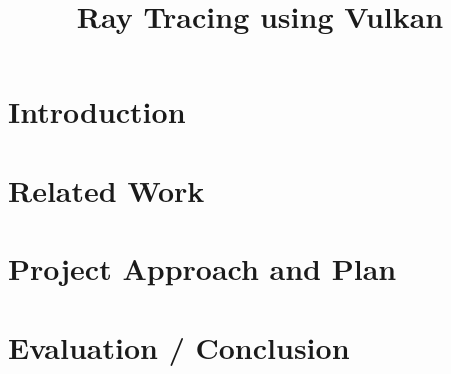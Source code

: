 \documentclass[conference]{IEEEtran}
\begin{document}
\title{Ray Tracing using Vulkan}

\author{
}

\maketitle

\begin{abstract}

\end{abstract}

\begin{IEEEkeywords}

\end{IEEEkeywords}

\section{Introduction} \label{introduction}

\section{Related Work} \label{related-work}

\section{Project Approach and Plan} \label{project-approach}
\section{Evaluation / Conclusion}


\printbibliography[heading=bibintoc,title={References}]
\end{document}
